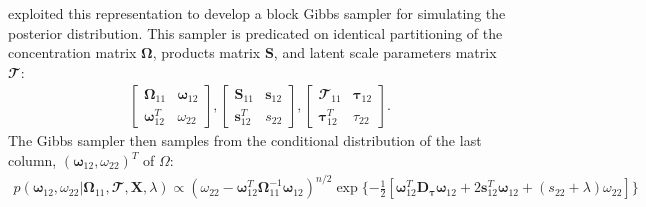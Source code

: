 \begin{DoubleSpace*}
\cite{wang2012} exploited this representation to develop a block Gibbs sampler for simulating the posterior distribution. This sampler is predicated on identical partitioning of the concentration matrix $\boldsymbol{\Omega}$, products matrix $\boldsymbol{S}$, and latent scale parameters matrix $\mathbfcal{T}$:
\begin{align}
\begin{bmatrix}
\boldsymbol{\Omega}_{11} & \boldsymbol{\omega}_{12} \\
\boldsymbol{\omega}_{12}^T & \omega_{22}
\end{bmatrix},
\begin{bmatrix}
\mathbf{S}_{11} & \mathbf{s}_{12} \\
\mathbf{s}_{12}^T & s_{22}
\end{bmatrix},
\begin{bmatrix}
\mathbfcal{T}_{11} & \boldsymbol{\tau}_{12} \\
\boldsymbol{\tau}_{12}^T & \tau_{22}
\end{bmatrix}.
\end{align}
The Gibbs sampler then samples from the conditional distribution of the last column, $(\boldsymbol{\omega}_{12}, \omega_{22})^T$ of $\Omega$:
\begin{align}
p(\boldsymbol{\omega}_{12}, \omega_{22}|\boldsymbol{\Omega}_{11},\mathbfcal{T},\textbf{X},\lambda) \propto \left(\omega_{22}-\boldsymbol{\omega}_{12}^T \boldsymbol{\Omega}_{11}^{-1}\boldsymbol{\omega}_{12} \right)^{n/2} \exp \{ - \frac{1}{2}\left[ \boldsymbol{\omega}_{12}^T \textbf{D}_{\boldsymbol{\tau}} \boldsymbol{\omega}_{12}+ 2 
\textbf{s}_{12}^T \boldsymbol{\omega}_{12} + (s_{22}+\lambda)\omega_{22}\right] \}
\end{align}


\end{DoubleSpace*}
